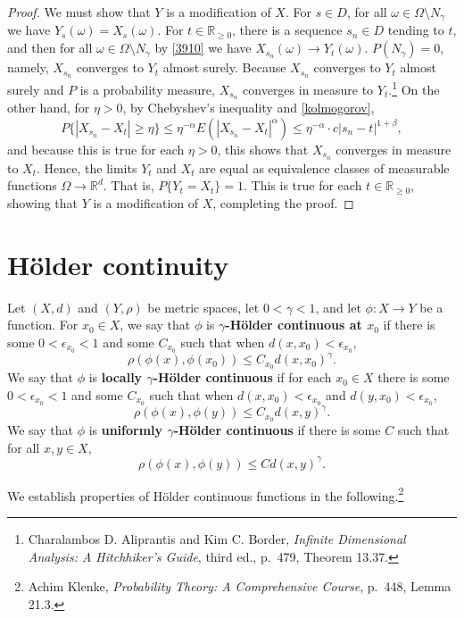 \documentclass{article}
\theoremstyle{definition}
\begin{document}
\begin{proof}
We must show that $Y$ is a modification of $X$. For $s \in D$, for all $\omega \in \Omega \setminus N_\gamma$ we have
$Y_s(\omega) = X_s(\omega)$. For $t \in \mathbb{R}_{\geq 0}$, there is a sequence $s_n \in D$ tending to $t$, and then
for all $\omega \in \Omega \setminus N_\gamma$  by \eqref{3910} we have $X_{s_n}(\omega) \to Y_t(\omega)$. 
$P(N_\gamma)=0$, namely, $X_{s_n}$ converges to $Y_t$ almost surely. Because $X_{s_n}$ converges to $Y_t$
almost surely and $P$ is a probability measure, $X_{s_n}$ converges in measure to $Y_t$.\footnote{Charalambos D. Aliprantis
and Kim C. Border, {\em Infinite Dimensional Analysis: A Hitchhiker's Guide}, third ed., p.~479, Theorem 13.37.}
On the other hand, 
for
$\eta>0$, by  Chebyshev's inequality and \eqref{kolmogorov},
\[
P\{|X_{s_n}-X_t| \geq \eta\} \leq \eta^{-\alpha} E(|X_{s_n}-X_t|^\alpha) \leq \eta^{-\alpha} \cdot c |s_n-t|^{1+\beta},
\]
and because this is true for each $\eta>0$,
this shows that $X_{s_n}$ converges in measure to $X_t$. Hence, 
the limits $Y_t$ and $X_t$ are equal as  equivalence classes of
measurable functions $\Omega \to \mathbb{R}^d$.
That is, $P\{Y_t = X_t\}=1$.  This is true for each $t \in \mathbb{R}_{\geq 0}$, showing that $Y$ is a modification of $X$, completing the proof.
\end{proof}

\section{H\"older continuity}
Let $(X,d)$ and $(Y,\rho)$ be metric spaces, let $0<\gamma<1$, and let
$\phi:X \to Y$ be a function. For 
$x_0 \in X$, we say that $\phi$ is \textbf{$\gamma$-H\"older continuous at $x_0$}
if there is some $0<\epsilon_{x_0}<1$ and some $C_{x_0}$ such that when
$d(x,x_0)< \epsilon_{x_0}$,
\[
\rho(\phi(x),\phi(x_0)) \leq C_{x_0} d(x,x_0)^\gamma.
\]
We say that $\phi$ is \textbf{locally $\gamma$-H\"older continuous} if for each
$x_0 \in X$ there is some $0<\epsilon_{x_0}<1$ and some
$C_{x_0}$ such that when $d(x,x_0)< \epsilon_{x_0}$ and $d(y,x_0)< \epsilon_{x_0}$,
\[
\rho(\phi(x),\phi(y)) \leq C_{x_0} d(x,y)^\gamma.
\]
We say that $\phi$ is \textbf{uniformly $\gamma$-H\"older continuous} if there is some
$C$ such that for all $x,y \in X$,
\[
\rho(\phi(x),\phi(y)) \leq C d(x,y)^\gamma.
\]

We establish properties of H\"older continuous functions in the following.\footnote{Achim Klenke, {\em Probability Theory: A Comprehensive Course}, p.~448, Lemma 21.3.}
\end{document}
